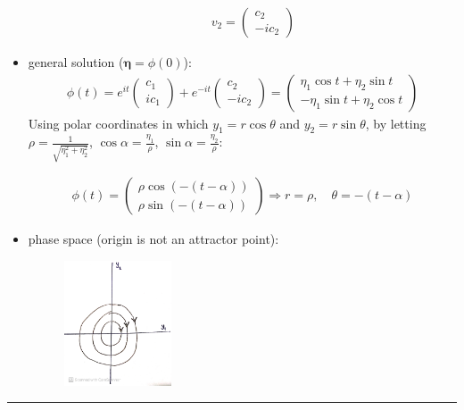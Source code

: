 \documentclass[12pt, letterpaper]{scrartcl}
\begin{document}
\begin{itemize}
\begin{itemize}
\begin{align*}
            v_2=\left(\begin{array}{c}
            c_2 \\
            -ic_2 
            \end{array}\right)
        \end{align*}
    \end{itemize}
    \item general solution (${\boldsymbol\eta}=\phi(0)$):
    \begin{align*}
        \phi(t)=
        e^{it}
        \left(\begin{array}{c}
            c_1 \\
            ic_1 
        \end{array}\right)
        +
        e^{-it}
        \left(\begin{array}{c}
            c_2 \\
            -ic_2 
        \end{array}\right)
        =
        \left(\begin{array}{c}
            \eta_1\cos t +\eta_2 \sin t\\
            -\eta_1\sin t +\eta_2 \cos t
        \end{array}\right)
    \end{align*}
    Using polar coordinates in which $y_1=r\cos\theta$ and $y_2=r\sin\theta$, by letting $\rho=\frac{1}{\sqrt{\eta_1^2+\eta_2^2}}$, $\cos \alpha=\frac{\eta_1}{\rho}$, $\sin \alpha=\frac{\eta_2}{\rho}$:

    \begin{align*}
        \phi(t)=\left(\begin{array}{c}
                \rho\cos(-(t-\alpha))\\
                \rho\sin(-(t-\alpha))
            \end{array}\right)
        \Longrightarrow
        r=\rho,\quad\theta=-(t-\alpha)
    \end{align*}

    \item phase space (origin is not an attractor point):
    \begin{figure}[H]
    \centering
    \includegraphics[width=0.3\textwidth]{fig/2.8.11.JPG}
    \end{figure}
\end{itemize}
\vskip1mm\hrule
\end{document}
